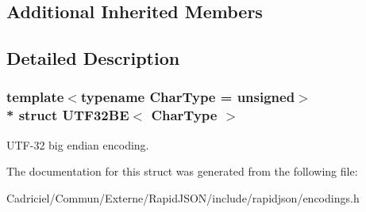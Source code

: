 \subsection*{Additional Inherited Members}


\subsection{Detailed Description}
\subsubsection*{template$<$typename Char\+Type = unsigned$>$\\*
struct U\+T\+F32\+B\+E$<$ Char\+Type $>$}

U\+T\+F-\/32 big endian encoding. 

The documentation for this struct was generated from the following file\+:\begin{DoxyCompactItemize}
\item 
Cadriciel/\+Commun/\+Externe/\+Rapid\+J\+S\+O\+N/include/rapidjson/encodings.\+h\end{DoxyCompactItemize}
